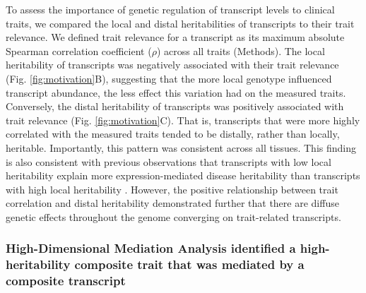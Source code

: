 \documentclass[
]{article}
\begin{document}
To assess the importance of genetic regulation of transcript levels to
clinical traits, we compared the local and distal heritabilities of
transcripts to their trait relevance. We defined trait relevance for a
transcript as its maximum absolute Spearman correlation coefficient
(\(\rho\)) across all traits (Methods). The local heritability of
transcripts was negatively associated with their trait relevance (Fig.
\ref{fig:motivation}B), suggesting that the more local genotype
influenced transcript abundance, the less effect this variation had on
the measured traits. Conversely, the distal heritability of transcripts
was positively associated with trait relevance (Fig.
\ref{fig:motivation}C). That is, transcripts that were more highly
correlated with the measured traits tended to be distally, rather than
locally, heritable. Importantly, this pattern was consistent across all
tissues. This finding is also consistent with previous observations that
transcripts with low local heritability explain more expression-mediated
disease heritability than transcripts with high local heritability
\cite{pmid32424349}. However, the positive relationship between trait
correlation and distal heritability demonstrated further that there are
diffuse genetic effects throughout the genome converging on
trait-related transcripts.

\subsubsection{High-Dimensional Mediation Analysis identified a
high-heritability composite trait that was mediated by a composite
transcript}\label{high-dimensional-mediation-analysis-identified-a-high-heritability-composite-trait-that-was-mediated-by-a-composite-transcript}
\end{document}
